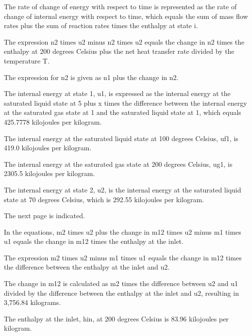 The rate of change of energy with respect to time is represented as the rate of change of internal energy with respect to time, which equals the sum of mass flow rates plus the sum of reaction rates times the enthalpy at state i.

The expression n2 times u2 minus n2 times u2 equals the change in n2 times the enthalpy at 200 degrees Celsius plus the net heat transfer rate divided by the temperature T.

The expression for n2 is given as n1 plus the change in n2.

The internal energy at state 1, u1, is expressed as the internal energy at the saturated liquid state at 5 plus x times the difference between the internal energy at the saturated gas state at 1 and the saturated liquid state at 1, which equals 425.7778 kilojoules per kilogram.

The internal energy at the saturated liquid state at 100 degrees Celsius, uf1, is 419.0 kilojoules per kilogram.

The internal energy at the saturated gas state at 200 degrees Celsius, ug1, is 2305.5 kilojoules per kilogram.

The internal energy at state 2, u2, is the internal energy at the saturated liquid state at 70 degrees Celsius, which is 292.55 kilojoules per kilogram.

The next page is indicated.

In the equations, m2 times u2 plus the change in m12 times u2 minus m1 times u1 equals the change in m12 times the enthalpy at the inlet.

The expression m2 times u2 minus m1 times u1 equals the change in m12 times the difference between the enthalpy at the inlet and u2.

The change in m12 is calculated as m2 times the difference between u2 and u1 divided by the difference between the enthalpy at the inlet and u2, resulting in 3,756.84 kilograms.

The enthalpy at the inlet, hin, at 200 degrees Celsius is 83.96 kilojoules per kilogram.